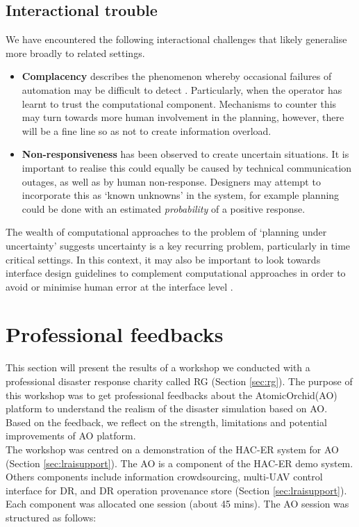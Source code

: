 \subsection{Interactional trouble}
We have encountered the following interactional challenges that likely generalise more broadly to related settings.
\begin{itemize}

\item \textbf{Complacency} describes the phenomenon whereby occasional failures of automation may be difficult to detect \cite{Kaber1997}. Particularly, when the operator has learnt to trust the computational component. Mechanisms to counter this may turn towards more human involvement in the planning, however, there will be a fine line so as not to create information overload. 
\item \textbf{Non-responsiveness} has been observed to create uncertain situations. It is important to realise this could equally be caused by technical communication outages, as well as by human non-response. Designers may attempt to incorporate this as  `known unknowns' in the system, for example planning could be done with an estimated \textit{probability} of a positive response. 
\end{itemize}   

The wealth of computational approaches to the problem of `planning under uncertainty' \cite{Chang2007} suggests uncertainty is a key recurring problem, particularly in time critical settings. In this context, it may also be important to look towards interface design guidelines to complement computational approaches in order to avoid or minimise human error at the interface level \cite{Norman2013}.


\section{Professional feedbacks}\label{sec:RGworkshopone} 

This section will present the results of a workshop we conducted with a professional disaster response charity called \acf{RG} (Section \ref{sec:rg}). The purpose of this workshop was to get professional feedbacks about the AtomicOrchid(AO) platform to understand the realism of the disaster simulation based on AO. Based on the feedback, we reflect on the strength, limitations and potential improvements of AO platform. \\

The workshop was centred on a demonstration of the HAC-ER system for \acf{AO} (Section \ref{sec:lraisupport}). The AO is a component of the HAC-ER demo system. Others components include information crowdsourcing, multi-UAV control interface for DR, and DR operation provenance store (Section \ref{sec:lraisupport}). Each component was allocated one session (about 45 mins). The AO session was structured as follows:\\

